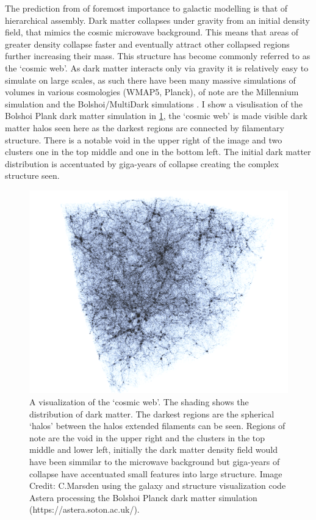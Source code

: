 The prediction from \LCDM of foremost importance to galactic modelling is that of hierarchical assembly. Dark matter collapses under gravity from an initial density field, that mimics the cosmic microwave background. This means that areas of greater density collapse faster and eventually attract other collapsed regions further increasing their mass. This structure has become commonly referred to as the `cosmic web'. As dark matter interacts only via gravity it is relatively easy to simulate on large scales, as such there have been many massive simulations of \LCDM volumes in various cosmologies (WMAP5, Planck), of note are the Millennium simulation \citep{Boylan-Kolchin2009ResolvingSimulation} and the Bolshoi/MultiDark simulations \citep{Klypin2016}. I show a visulisation of the Bolshoi Plank dark matter simulation in \ref{fig:DMStruct}, the `cosmic web' is made visible dark matter halos seen here as the darkest regions are connected by filamentary structure. There is a notable void in the upper right of the image and two clusters one in the top middle and one in the bottom left. The initial dark matter distribution is accentuated by giga-years of collapse creating the complex structure seen.

\begin{figure}[h]
	\centering
	\includegraphics[width = \linewidth]{Figures/Chapter1/DMStruct.png}
    \caption{A visualization of the `cosmic web'. The shading shows the distribution of dark matter. The darkest regions are the spherical `halos' between the halos extended filaments can be seen. Regions of note are the void in the upper right and the clusters in the top middle and lower left, initially the dark matter density field would have been simmilar to the microwave background but giga-years of collapse have accentuated small features into large structure. Image Credit: C.Marsden using the galaxy and structure visualization code Astera processing the Bolshoi Planck dark matter simulation (https://astera.soton.ac.uk/).}
	\label{fig:DMStruct}
\end{figure}

